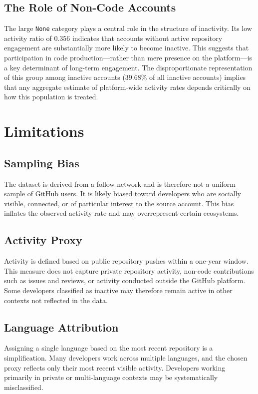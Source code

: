 \documentclass[12pt,a4paper]{article}
\begin{document}
\subsection{The Role of Non-Code Accounts}

The large \texttt{None} category plays a central role in the structure of inactivity. Its low activity ratio of $0.356$ indicates that accounts without active repository engagement are substantially more likely to become inactive. This suggests that participation in code production---rather than mere presence on the platform---is a key determinant of long-term engagement. The disproportionate representation of this group among inactive accounts ($39.68\%$ of all inactive accounts) implies that any aggregate estimate of platform-wide activity rates depends critically on how this population is treated.

\section{Limitations}

\subsection{Sampling Bias}

The dataset is derived from a follow network and is therefore not a uniform sample of GitHub users. It is likely biased toward developers who are socially visible, connected, or of particular interest to the source account. This bias inflates the observed activity rate and may overrepresent certain ecosystems.

\subsection{Activity Proxy}

Activity is defined based on public repository pushes within a one-year window. This measure does not capture private repository activity, non-code contributions such as issues and reviews, or activity conducted outside the GitHub platform. Some developers classified as inactive may therefore remain active in other contexts not reflected in the data.

\subsection{Language Attribution}

Assigning a single language based on the most recent repository is a simplification. Many developers work across multiple languages, and the chosen proxy reflects only their most recent visible activity. Developers working primarily in private or multi-language contexts may be systematically misclassified.
\end{document}
